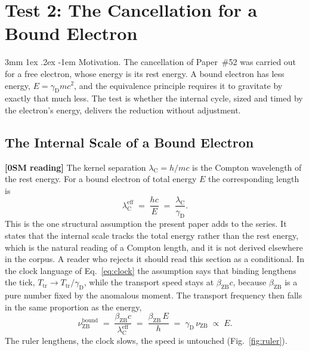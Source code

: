 \documentclass[%
 reprint, amsmath,amssymb, aps, prb, ]{revtex4-2}
\makeatletter
\numberwithin{equation}{section}
\renewcommand\paragraph{%
  \@startsection{paragraph}{4}{\z@}%
    {3mm \@plus 1ex \@minus .2ex}%
    {-1em}%
    {\normalfont\normalsize\itshape}}
\newcommand{\betaZB}{\beta_{\text{ZB}}}
\newcommand{\lambdaC}{\lambda_{\text{C}}}
\newcommand{\nuZB}{\nu_{\text{ZB}}}
\newcommand{\Ttr}{T_{\text{tr}}}
\newcommand{\gammaD}{\gamma_{\text{D}}}
\makeatother
\begin{document}
\section{Test 2: The Cancellation for a Bound Electron}
\label{sec:bound}

\paragraph{Motivation.} The cancellation of Paper~\#52 was carried out for a free electron, whose energy is its rest energy. A bound electron has less energy, $E = \gammaD mc^{2}$, and the equivalence principle requires it to gravitate by exactly that much less. The test is whether the internal cycle, sized and timed by the electron's energy, delivers the reduction without adjustment.

\subsection{The Internal Scale of a Bound Electron}
\label{subsec:lambda_eff}

\textbf{[0SM reading]} The kernel separation $\lambdaC = h/mc$ is the Compton wavelength of the rest energy. For a bound electron of total energy $E$ the corresponding length is
\begin{equation}
\lambdaC^{\text{eff}} \;=\; \frac{hc}{E} \;=\; \frac{\lambdaC}{\gammaD}.
\label{eq:lameff}
\end{equation}
This is the one structural assumption the present paper adds to the series. It states that the internal scale tracks the total energy rather than the rest energy, which is the natural reading of a Compton length, and it is not derived elsewhere in the corpus. A reader who rejects it should read this section as a conditional. In the clock language of Eq.~\eqref{eq:clock} the assumption says that binding lengthens the tick, $\Ttr \to \Ttr/\gammaD$, while the transport speed stays at $\betaZB c$, because $\betaZB$ is a pure number fixed by the anomalous moment. The transport frequency then falls in the same proportion as the energy,
\begin{equation}
\nuZB^{\text{bound}} \;=\; \frac{\betaZB c}{\lambdaC^{\text{eff}}} \;=\; \frac{\betaZB\,E}{h} \;=\; \gammaD\,\nuZB \;\propto\; E .
\label{eq:nuE}
\end{equation}
The ruler lengthens, the clock slows, the speed is untouched (Fig.~\ref{fig:ruler}).
\end{document}

